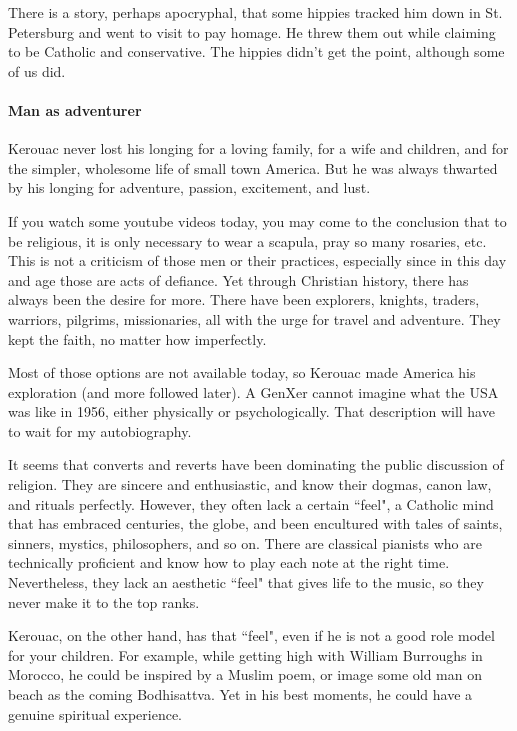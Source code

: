There is a story, perhaps apocryphal, that some hippies tracked him down in St. Petersburg and went to visit to pay homage. He threw them out while claiming to be Catholic and conservative. The hippies didn't get the point, although some of us did.

\paragraph{Man as adventurer}
\begin{quotex}
Kerouac never lost his longing for a loving family, for a wife and children, and for the simpler, wholesome life of small town America. But he was always thwarted by his longing for adventure, passion, excitement, and lust. 

\end{quotex}
If you watch some youtube videos today, you may come to the conclusion that to be religious, it is only necessary to wear a scapula, pray so many rosaries, etc. This is not a criticism of those men or their practices, especially since in this day and age those are acts of defiance. Yet through Christian history, there has always been the desire for more. There have been explorers, knights, traders, warriors, pilgrims, missionaries, all with the urge for travel and adventure. They kept the faith, no matter how imperfectly.

Most of those options are not available today, so Kerouac made America his exploration (and more followed later). A GenXer cannot imagine what the USA was like in 1956, either physically or psychologically. That description will have to wait for my autobiography.

It seems that converts and reverts have been dominating the public discussion of religion. They are sincere and enthusiastic, and know their dogmas, canon law, and rituals perfectly. However, they often lack a certain ``feel", a Catholic mind that has embraced centuries, the globe, and been encultured with tales of saints, sinners, mystics, philosophers, and so on. There are classical pianists who are technically proficient and know how to play each note at the right time. Nevertheless, they lack an aesthetic ``feel" that gives life to the music, so they never make it to the top ranks.

Kerouac, on the other hand, has that ``feel", even if he is not a good role model for your children. For example, while getting high with William Burroughs in Morocco, he could be inspired by a Muslim poem, or image some old man on beach as the coming Bodhisattva. Yet in his best moments, he could have a genuine spiritual experience.

